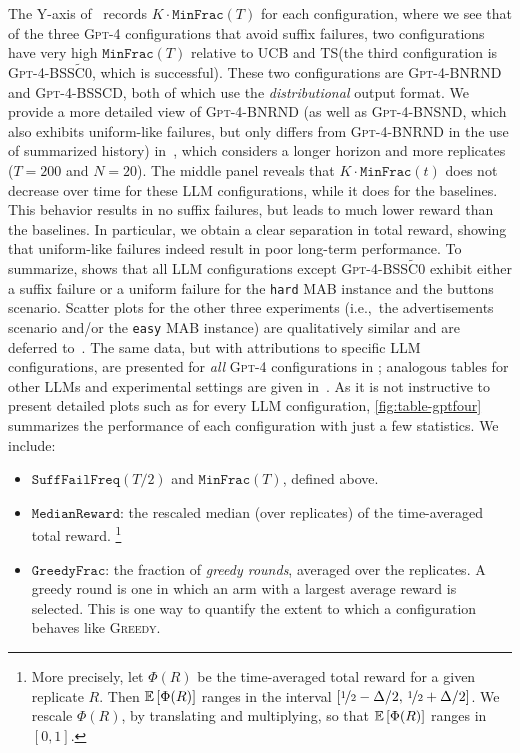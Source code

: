 \documentclass[11pt]{article}
\newcommand{\gptfour}{\textsc{Gpt-4}\xspace}
\newcommand{\ucb}{\textsc{UCB}\xspace}
\newcommand{\ts}{\textsc{TS}\xspace}
\newcommand{\greedy}{\textsc{Greedy}\xspace}
\newcommand{\tC}{\widetilde{\text{C}}}
\newcommand{\MinFrac}{\texttt{MinFrac}}
\newcommand{\SuffFailFreq}{\texttt{SuffFailFreq}}
\newcommand{\GreedyFrac}{\texttt{GreedyFrac}}
\newcommand{\MedRew}{\texttt{MedianReward}}
\newcommand{\easy}{\texttt{easy}\xspace}
\newcommand{\hard}{\texttt{hard}\xspace}
\newcommand{\E}{\operatornamewithlimits{\ensuremath{\mathbb{E}}}}
\newcommand{\xhdr}[1]{\vspace{2mm} \noindent{\bf #1}}
\newcommand{\ie}{{i.e.,~\xspace}}
\begin{document}
The Y-axis of~ records $K\cdot\MinFrac(T)$ for each
configuration, where we see that of the three \gptfour configurations
that avoid suffix failures, two configurations have very high $\MinFrac(T)$ relative to
\ucb and \ts (the third configuration is \gptfour-BSS$\tC$0, which is successful).  These two configurations are \gptfour-BNRND and
\gptfour-BSSCD, both of which use the \emph{distributional} output format.
We provide a more detailed view of \gptfour-BNRND (as well as
\gptfour-BNSND, which also exhibits uniform-like failures, but only differs from \gptfour-BNRND in the use of summarized history)
in~, which considers a longer horizon and more
replicates ($T=200$ and $N=20$).  The middle panel reveals that
$K\cdot\MinFrac(t)$ does not decrease over time for these LLM configurations, while it
does for the baselines.  This behavior results in no suffix failures,
but leads to much lower reward than the baselines.  In particular, we obtain a clear separation in
total reward, showing that uniform-like failures indeed result in poor
long-term performance.
\xhdr{Generality of the failures.}
To summarize,  shows that all LLM configurations except \gptfour-BSS$\tC$0 exhibit either a suffix failure or a uniform failure for the \hard MAB instance and the buttons scenario.
Scatter plots for the other three experiments (\ie the advertisements scenario and/or the \easy MAB instance) are qualitatively similar and are deferred to~.
\newcommand{\AveRew}{\Phi}
The same data, but with attributions to specific LLM configurations,
are presented for \emph{all} \gptfour configurations in ; analogous
tables for other LLMs and experimental settings are given in~.
As it is not instructive to present detailed plots such as
 for every LLM configuration,
\cref{fig:table-gptfour} summarizes the performance of each configuration with just a few statistics. We include:
\begin{itemize}
\setlength{\itemsep}{0pt}
\item $\SuffFailFreq(T/2)$ and $\MinFrac(T)$, defined above.
\item $\MedRew$: the rescaled median (over replicates) of the time-averaged total reward.
\footnote{More precisely, let $\AveRew(R)$ be the time-averaged total reward for a given replicate $R$. Then
    $\E\sbr{\AveRew(R)}$ ranges in the interval $[\nicefrac12-\Delta/2,\, \nicefrac12+\Delta/2 ]$.
We rescale $\AveRew(R)$, by translating and multiplying, so that $\E\sbr{\AveRew(R)}$ ranges in $[0,1]$.}
\item $\GreedyFrac$: the fraction of \emph{greedy rounds}, averaged over the replicates. A greedy round is one in which an arm with a largest average reward is selected. This is one way to quantify the extent to which a configuration behaves like \greedy.
\end{itemize}
\end{document}
